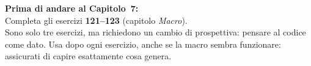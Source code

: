 \begin{workbook}
\textbf{Prima di andare al Capitolo~7:}\\[4pt]
Completa gli esercizi \textbf{121--123} (capitolo \emph{Macro}).\\[4pt]
Sono solo tre esercizi, ma richiedono un cambio di prospettiva:
pensare al codice come dato.
Usa  dopo ogni esercizio, anche se la macro
sembra funzionare: assicurati di capire esattamente cosa genera.
\end{workbook}
